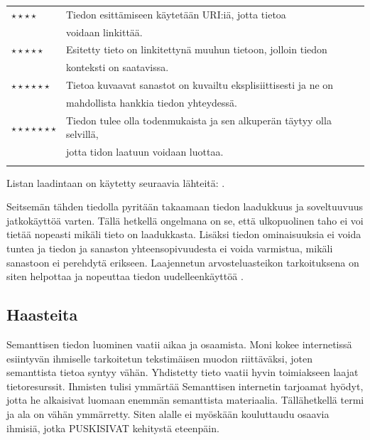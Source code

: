 \documentclass[finnish, 12pt, a4paper, elec, utf8, pdfa, online]{aaltothesis}
\begin{document}
{\begin{tabular}{ll}
$\star\star\star\star$      & Tiedon esittämiseen käytetään URI:iä, jotta tietoa \\
\vspace*{0.2cm}             & voidaan linkittää. \\
$\star\star\star\star\star$ & Esitetty tieto on linkitettynä muuhun tietoon, jolloin tiedon \\        \vspace*{0.5cm}             & konteksti on saatavissa. \\
$\star\star\star\star\star\star$     & Tietoa kuvaavat sanastot on kuvailtu eksplisiittisesti ja ne on\\   \vspace*{0.2cm}               & mahdollista hankkia tiedon yhteydessä. \\
$\star\star\star\star\star\star\star$   & Tiedon tulee olla todenmukaista ja sen alkuperän täytyy olla selvillä, \\                & jotta tidon laatuun voidaan luottaa. \\ \vspace*{0.05cm}
\end{tabular}
Listan laadintaan on käytetty seuraavia lähteitä: \cite{SeCo_stars} \cite{SeCo_stars2} \cite{Tim-BL}.

Seitsemän tähden tiedolla pyritään takaamaan tiedon laadukkuus ja soveltuuvuus jatkokäyttöä varten. Tällä hetkellä ongelmana on se, että ulkopuolinen taho ei voi tietää nopeasti mikäli tieto on laadukkasta. Lisäksi tiedon ominaisuuksia ei voida tuntea ja tiedon ja sanaston yhteensopivuudesta ei voida varmistua, mikäli sanastoon ei perehdytä erikseen. Laajennetun arvosteluasteikon tarkoituksena on siten helpottaa ja nopeuttaa tiedon uudelleenkäyttöä \cite{SeCo_stars}.


\subsection{Haasteita}
Semanttisen tiedon luominen vaatii aikaa ja osaamista. Moni kokee internetissä esiintyvän ihmiselle tarkoitetun tekstimäisen muodon riittäväksi, joten semanttista tietoa syntyy vähän. Yhdistetty tieto vaatii hyvin toimiakseen laajat tietoresurssit. Ihmisten tulisi ymmärtää Semanttisen internetin tarjoamat hyödyt, jotta he alkaisivat luomaan enemmän semanttista materiaalia. Tällähetkellä termi ja ala on vähän ymmärretty. Siten alalle ei myöskään kouluttaudu osaavia ihmisiä, jotka PUSKISIVAT kehitystä eteenpäin.



}
\end{document}
